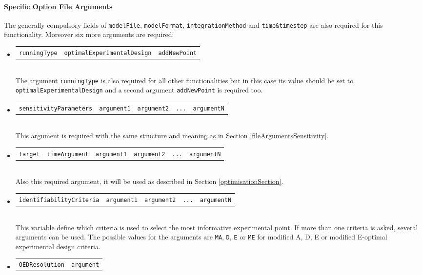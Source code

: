 \documentclass[a4paper, 11pt]{article}
\begin{document}
\paragraph{Specific Option File Arguments}
The generally compulsory fields of \texttt{modelFile}, \texttt{modelFormat}, \texttt{integrationMethod} and \texttt{time\&timestep} are also required for this functionality.
Moreover six more arguments are required:
\begin{itemize}
  \item \begin{tabular}{ccc}\texttt{runningType}&\texttt{optimalExperimentalDesign}&\texttt{addNewPoint}\end{tabular}\\[1.5ex]
    The argument \texttt{runningType} is also required for all other functionalities but in this case its value should be set to \texttt{optimalExperimentalDesign} and a second argument \texttt{addNewPoint} is required too.
    \item \begin{tabular}{ccccc}\texttt{sensitivityParameters}&\texttt{argument1}&\texttt{argument2}&\texttt{...}&\texttt{argumentN}\end{tabular}\\[1.5ex]
      This argument is required with the same structure and meaning as in Section \ref{fileArgumentsSensitivity}.
    \item \begin{tabular}{cccccc}\texttt{target}&\texttt{timeArgument}&\texttt{argument1}&\texttt{argument2}&\texttt{...}&\texttt{argumentN}\end{tabular}\\[1.5ex]
      Also this required argument, it will be used as described in Section \ref{optimisationSection}.
    \item \begin{tabular}{ccccc}\texttt{identifiabilityCriteria}&\texttt{argument1}&\texttt{argument2}&\texttt{...}&\texttt{argumentN}\end{tabular}\\[1.5ex]
      This variable define which criteria is used to select the most informative experimental point.
      If more than one criteria is asked, several arguments can be used.
      The possible values for the arguments are \texttt{MA}, \texttt{D}, \texttt{E} or \texttt{ME} for modified A, D, E or modified E-optimal experimental design criteria.
    \item \begin{tabular}{cc}\texttt{OEDResolution}&\texttt{argument}\end{tabular}\\[1.5ex]

\end{itemize}
\end{document}
